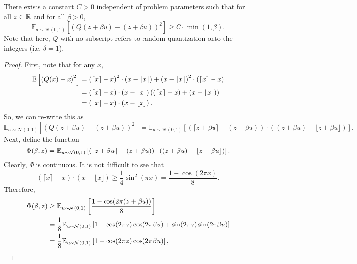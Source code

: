 \begin{lemma}
  \label{lemmaCzbeta}
  There exists a constant $C > 0$ independent of problem parameters such that for all $z \in \mathbb{R}$ and for all $\beta > 0$,
  \[
    \mathbb{E}_{u \sim \mathcal{N}(0,1)}\left[\left( Q(z + \beta u) - (z + \beta u) \right)^2 \right]
    \ge
    C \cdot \min(1, \beta).
  \]
  Note that here, $Q$ with no subscript refers to random quantization onto the integers (i.e. $\delta = 1$).
\end{lemma}
\begin{proof}
  First, note that for any $x$, 
  \begin{align*}
    \mathbb{E}\left[  \left( Q(x) - x \right)^2  \right]
    &=
    \left( \lceil x \rceil - x \right)^2 \cdot \left( x - \lfloor x \rfloor \right)
    +
    \left( x - \lfloor x \rfloor \right)^2 \cdot \left( \lceil x \rceil - x \right) \\
    &=
    \left( \lceil x \rceil - x \right) \cdot \left( x - \lfloor x \rfloor \right) \left(
      \left( \lceil x \rceil - x \right)
      +
      \left( x - \lfloor x \rfloor \right)
    \right) \\
    &=
    \left( \lceil x \rceil - x \right) \cdot \left( x - \lfloor x \rfloor \right).
  \end{align*}
  So, we can re-write this as
  \[
  \mathbb{E}_{u \sim \mathcal{N}(0,1)}\left[ \left( Q(z + \beta u) - (z + \beta u) \right)^2 \right]
    =
    \mathbb{E}_{u \sim \mathcal{N}(0,1)}\left[ \left( \lceil z + \beta u \rceil - (z + \beta u) \right) \cdot \left( (z + \beta u) - \lfloor z + \beta u \rfloor \right) \right].
  \]
  Next, define the function
  \[
    \Phi(\beta, z)
    =
    \mathbb{E}_{u \sim \mathcal{N}(0,1)}\left[  \left( \lceil z + \beta u \rceil - (z + \beta u) \right) \cdot \left( (z + \beta u) - \lfloor z + \beta u \rfloor \right)  \right].
  \]
  Clearly, $\Phi$ is continuous.
  It is not difficult to see that
  \[
    \left( \lceil x \rceil - x \right) \cdot \left( x - \lfloor x \rfloor \right)
    \ge
    \frac{1}{4} \sin^2(\pi x)
    =
    \frac{1 - \cos(2 \pi x)}{8}.
  \]
  Therefore,
  \begin{align*}
    \Phi(\beta, z)
    &\ge 
    \mathbb{E}_{u \sim \mathcal{N}(0,1)}\left[  \frac{1 - \cos(2 \pi (z + \beta u))}{8}  \right] \\
    &=
    \frac{1}{8} \mathbb{E}_{u \sim \mathcal{N}(0,1)}\left[  1 - \cos(2 \pi z) \cos(2 \pi \beta u) + \sin(2 \pi z) \sin(2 \pi \beta u)  \right] \\
    &=
    \frac{1}{8} \mathbb{E}_{u \sim \mathcal{N}(0,1)}\left[  1 - \cos(2 \pi z) \cos(2 \pi \beta u)  \right],
  \end{align*}

\end{proof}
